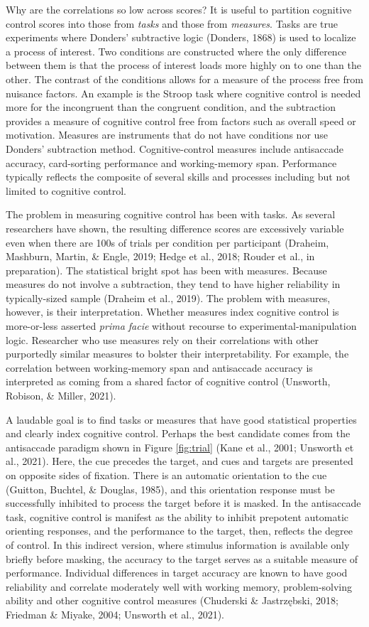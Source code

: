 \documentclass[
  ,man,floatsintext]{apa6}
\begin{document}
Why are the correlations so low across scores? It is useful to partition cognitive control scores into those from \emph{tasks} and those from \emph{measures}. Tasks are true experiments where Donders' subtractive logic (Donders, 1868) is used to localize a process of interest. Two conditions are constructed where the only difference between them is that the process of interest loads more highly on to one than the other. The contrast of the conditions allows for a measure of the process free from nuisance factors. An example is the Stroop task where cognitive control is needed more for the incongruent than the congruent condition, and the subtraction provides a measure of cognitive control free from factors such as overall speed or motivation. Measures are instruments that do not have conditions nor use Donders' subtraction method. Cognitive-control measures include antisaccade accuracy, card-sorting performance and working-memory span. Performance typically reflects the composite of several skills and processes including but not limited to cognitive control.

The problem in measuring cognitive control has been with tasks. As several researchers have shown, the resulting difference scores are excessively variable even when there are 100s of trials per condition per participant (Draheim, Mashburn, Martin, \& Engle, 2019; Hedge et al., 2018; Rouder et al., in preparation). The statistical bright spot has been with measures. Because measures do not involve a subtraction, they tend to have higher reliability in typically-sized sample (Draheim et al., 2019). The problem with measures, however, is their interpretation. Whether measures index cognitive control is more-or-less asserted \emph{prima facie} without recourse to experimental-manipulation logic. Researcher who use measures rely on their correlations with other purportedly similar measures to bolster their interpretability. For example, the correlation between working-memory span and antisaccade accuracy is interpreted as coming from a shared factor of cognitive control (Unsworth, Robison, \& Miller, 2021).

A laudable goal is to find tasks or measures that have good statistical properties and clearly index cognitive control. Perhaps the best candidate comes from the antisaccade paradigm shown in Figure \ref{fig:trial} (Kane et al., 2001; Unsworth et al., 2021). Here, the cue precedes the target, and cues and targets are presented on opposite sides of fixation. There is an automatic orientation to the cue (Guitton, Buchtel, \& Douglas, 1985), and this orientation response must be successfully inhibited to process the target before it is masked. In the antisaccade task, cognitive control is manifest as the ability to inhibit prepotent automatic orienting responses, and the performance to the target, then, reflects the degree of control. In this indirect version, where stimulus information is available only briefly before masking, the accuracy to the target serves as a suitable measure of performance. Individual differences in target accuracy are known to have good reliability and correlate moderately well with working memory, problem-solving ability and other cognitive control measures (Chuderski \& Jastrzębski, 2018; Friedman \& Miyake, 2004; Unsworth et al., 2021).
\end{document}
